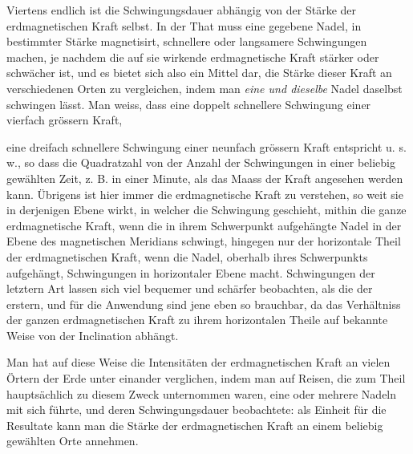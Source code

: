 Viertens endlich ist die Schwingungsdauer abhängig von der Stärke der erdmagnetischen Kraft selbst. In der That muss eine gegebene Nadel, in bestimmter Stärke magnetisirt, schnellere oder langsamere Schwingungen machen, je nachdem die auf sie wirkende erdmagnetische Kraft stärker oder schwächer ist, und es bietet sich also ein Mittel dar, die Stärke dieser Kraft an verschiedenen Orten zu vergleichen, indem man \textit{eine und dieselbe} Nadel daselbst schwingen lässt. Man weiss, dass eine doppelt schnellere Schwingung einer vierfach grössern Kraft,
\par\GaussVSourceGathering{41\textsuperscript{*}}
\par\clearpage
{}
\noindent eine dreifach schnellere Schwingung einer neunfach grössern Kraft entspricht u. s. w., so dass die Quadratzahl von der Anzahl der Schwingungen in einer beliebig gewählten Zeit, z. B. in einer Minute, als das Maass der Kraft angesehen werden kann. Übrigens ist hier immer die erdmagnetische Kraft zu verstehen, so weit sie in derjenigen Ebene wirkt, in welcher die Schwingung geschieht, mithin die ganze erdmagnetische Kraft, wenn die in ihrem Schwerpunkt aufgehängte Nadel in der Ebene des magnetischen Meridians schwingt, hingegen nur der horizontale Theil der erdmagnetischen Kraft, wenn die Nadel, oberhalb ihres Schwerpunkts aufgehängt, Schwingungen in horizontaler Ebene macht. Schwingungen der letztern Art lassen sich viel bequemer und schärfer beobachten, als die der erstern, und für die Anwendung sind jene eben so brauchbar, da das Verhältniss der ganzen erdmagnetischen Kraft zu ihrem horizontalen Theile auf bekannte Weise von der Inclination abhängt.

Man hat auf diese Weise die Intensitäten der erdmagnetischen Kraft an vielen Örtern der Erde unter einander verglichen, indem man auf Reisen, die zum Theil hauptsächlich zu diesem Zweck unternommen waren, eine oder mehrere Nadeln mit sich führte, und deren Schwingungsdauer beobachtete: als Einheit für die Resultate kann man die Stärke der erdmagnetischen Kraft an einem beliebig gewählten Orte annehmen.

